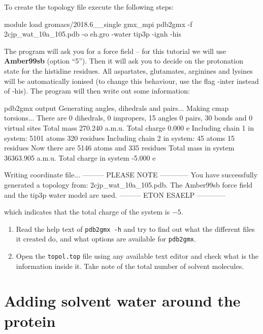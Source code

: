 \documentclass[10pt]{article}
\begin{document}
To create the topology file execute the following steps:

\begin{cmdline}
module load gromacs/2018.6__single
gmx_mpi pdb2gmx -f 2cjp_wat_10a_105.pdb -o eh.gro -water tip3p -ignh -his 
\end{cmdline}

The program will ask you for a force field -- for this tutorial we will use \textbf{Amber99sb} (option ``5''). Then it will ask you to decide on the protonation state for the histidine residues. All aspartates, glutamates, arginines and lysines will be automatically ionised (to change this behaviour, use the flag -inter instead of -his). The program will then write out some information:

\begin{script}{pdb2gmx output}
Generating angles, dihedrals and pairs...
Making cmap torsions...
There are    0 dihedrals,    0 impropers,   15 angles
             0 pairs,       30 bonds and     0 virtual sites
Total mass 270.240 a.m.u.
Total charge 0.000 e
Including chain 1 in system: 5101 atoms 320 residues
Including chain 2 in system: 45 atoms 15 residues
Now there are 5146 atoms and 335 residues
Total mass in system 36363.905 a.m.u.
Total charge in system -5.000 e

Writing coordinate file...
		--------- PLEASE NOTE ------------
You have successfully generated a topology from: 2cjp_wat_10a_105.pdb.
The Amber99sb force field and the tip3p water model are used.
		--------- ETON ESAELP ------------
\end{script}

which indicates that the total charge of the system is \(-5\).

\begin{question} 
    \begin{enumerate}[leftmargin=0.6cm]
        \renewcommand{\labelenumi}{Q\arabic{enumi}.}
        \setcounter{enumi}{4}
        \item Read the help text of \texttt{pdb2gmx -h} and try to find out what the different files it created do, and what options are available for \texttt{pdb2gmx}. 
        \item Open the \texttt{topol.top} file using any available text editor and check what is the information inside it. Take note of the total number of solvent molecules. 
    \end{enumerate}
\end{question}


\section{Adding solvent water around the protein}
\end{document}
